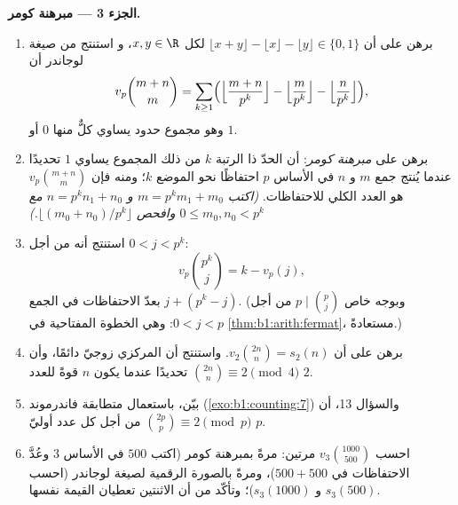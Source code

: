 \begin{problem}
\medskip
\noindent\textbf{الجزء 3 --- مبرهنة كومر.}
\begin{enumerate}[resume]
  \item برهن على أن $\lfloor x + y \rfloor - \lfloor x \rfloor -
        \lfloor y \rfloor \in \{0, 1\}$ لكل $x, y \in \R$، و
        استنتج من صيغة لوجاندر أن
        \[
        v_p\binom{m+n}m
        = \sum_{k\geq1}\Bigl(
        \Bigl\lfloor\frac{m+n}{p^k}\Bigr\rfloor
        - \Bigl\lfloor\frac{m}{p^k}\Bigr\rfloor
        - \Bigl\lfloor\frac{n}{p^k}\Bigr\rfloor\Bigr),
        \]
        وهو مجموع حدود يساوي كلٌّ منها $0$ أو $1$.
  \item برهن على \emph{مبرهنة كومر}: أن الحدّ ذا الرتبة $k$ من ذلك المجموع
        يساوي $1$ تحديدًا عندما يُنتج جمع $m$ و $n$ في
        الأساس $p$ احتفاظًا نحو الموضع $k$؛ ومنه فإن
        $v_p\binom{m+n}m$ هو العدد الكلي للاحتفاظات.
        \emph{(اكتب $m = p^km_1 + m_0$ و $n = p^kn_1 + n_0$
        مع $0 \leq m_0, n_0 < p^k$ وافحص $\lfloor (m_0 +
        n_0)/p^k \rfloor$.)}
  \item استنتج أنه من أجل $0 < j < p^k$:
        \[
        v_p\binom{p^k}{j} = k - v_p(j) ,
        \]
        بعدّ الاحتفاظات في الجمع $j + (p^k - j)$.
        (وبوجه خاص $p \mid \binom p j$ من أجل $0 < j < p$: وهي
        الخطوة المفتاحية في \cref{thm:b1:arith:fermat}، مستعادةً.)
  \item برهن على أن $v_2\binom{2n}n = s_2(n)$. واستنتج أن
         المركزي زوجيّ دائمًا، وأن
        $\binom{2n}n \equiv 2 \pmod 4$ تحديدًا عندما يكون $n$ قوةً
        للعدد $2$.
  \item بيّن، باستعمال متطابقة فاندرموند
        (\cref{exo:b1:counting:7}) والسؤال 13، أن
        $\binom{2p}p \equiv 2 \pmod p$ من أجل كل عدد أوليّ $p$.
  \item احسب $v_3\binom{1000}{500}$ مرتين: مرةً بمبرهنة كومر
        (اكتب $500$ في الأساس $3$ وعُدَّ الاحتفاظات في $500 +
        500$)، ومرةً بالصورة الرقمية لصيغة لوجاندر (احسب $s_3(500)$
        و $s_3(1000)$)؛ وتأكّد من أن الاثنتين تعطيان القيمة نفسها.
\end{enumerate}


\end{problem}
